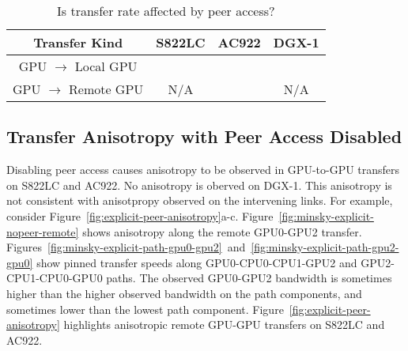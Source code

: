 \begin{table}[ht]
	\centering
	\caption[Matrix: Transfer rate affected by peer access]{Is transfer rate affected by peer access?}
	\label{tab:explicit-peer-rate}
	\begin{tabular}{|c|c|c|c|}
		\hline
		\textbf{Transfer Kind}       & \textbf{S822LC} & \textbf{AC922} & \textbf{DGX-1} \\ \hline 
		GPU $\rightarrow$ Local GPU  & \checkmark      & \checkmark     & \checkmark     \\ \hline
		GPU $\rightarrow$ Remote GPU & N/A             & \checkmark     & N/A            \\ \hline
	\end{tabular}
\end{table}


\subsection{Transfer Anisotropy with Peer Access Disabled}
\label{sec:explicit-peer-direction}

Disabling peer access causes anisotropy to be observed in GPU-to-GPU transfers on S822LC and AC922.
No anisotropy is oberved on DGX-1.
This anisotropy is not consistent with anisotpropy observed on the intervening links.
For example, consider Figure~\ref{fig:explicit-peer-anisotropy}a-c.
Figure~\ref{fig:minsky-explicit-nopeer-remote} shows anisotropy along the remote GPU0-GPU2 transfer.
Figures~\ref{fig:minsky-explicit-path-gpu0-gpu2}~and~\ref{fig:minsky-explicit-path-gpu2-gpu0} show pinned transfer speeds along GPU0-CPU0-CPU1-GPU2 and GPU2-CPU1-CPU0-GPU0 paths.
The observed GPU0-GPU2 bandwidth is sometimes higher than the higher observed bandwidth on the path components, and sometimes lower than the lowest path component.
Figure~\ref{fig:explicit-peer-anisotropy} highlights anisotropic remote GPU-GPU transfers on S822LC and AC922.

